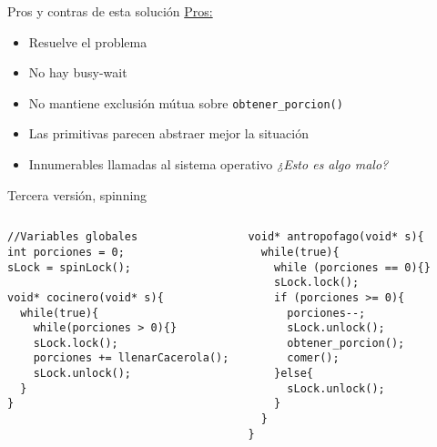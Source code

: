 \documentclass[presentation]{beamer}
\begin{document}
\begin{frame}{Pros y contras de esta solución}
\underline{Pros:}
\begin{itemize}
\item<1-> Resuelve el problema
\item<2-> No hay busy-wait
\item<3-> No mantiene exclusión mútua sobre \texttt{obtener\_porcion()}
\item<4-> Las primitivas parecen abstraer mejor la situación
\end{itemize}

\begin{itemize}
\item<5-> Innumerables llamadas al sistema operativo  {\emph{¿Esto es algo malo?}}
\end{itemize}

\end{frame}





\begin{frame}[fragile]{Tercera versión, spinning}

\lstset{language=C++, basicstyle=\scriptsize}

\begin{columns}

\begin{lstlisting}
//Variables globales
int porciones = 0;
sLock = spinLock();

void* cocinero(void* s){
  while(true){
    while(porciones > 0){}
    sLock.lock();
    porciones += llenarCacerola();
    sLock.unlock();
  }
}
\end{lstlisting}


\begin{lstlisting}
void* antropofago(void* s){
  while(true){
    while (porciones == 0){}
    sLock.lock();
    if (porciones >= 0){
      porciones--;
      sLock.unlock();
      obtener_porcion();
      comer();
    }else{
      sLock.unlock();
    }    
  }
}
\end{lstlisting}


\end{columns}

\end{frame}
\end{document}
